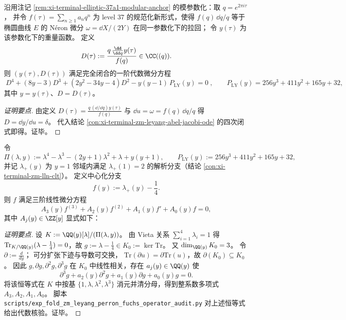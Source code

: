 \begin{conclusion}[模性--微分闭合：\texorpdfstring{$D(\tau)=\frac{q\,\partial_q y(\tau)}{f(q)}$}{D(tau)=q y'/f} 满足同一四次方程]\label{con:xi-terminal-zm-leyang-modular-differential-closure}
沿用注记 \ref{rem:xi-terminal-elliptic-37a1-modular-anchor} 的模参数化：取 \(q=e^{2\pi i\tau}\)，
并令 \(f(\tau)=\sum_{n\ge 1}a_n q^n\) 为 level \(37\) 的规范化新形式，使得 \(f(q)\,\dd q/q\) 等于椭圆曲线 \(E\) 的 N\'eron 微分 \(\omega=\dd X/(2Y)\) 在同一参数化下的拉回；
令 \(y(\tau)\) 为该参数化下的重量函数。
定义
\[
D(\tau):=\frac{q\,\frac{\dd}{\dd q}y(\tau)}{f(q)}\in \CC((q)).
\]
则 \((y(\tau),D(\tau))\) 满足完全闭合的一阶代数微分方程
\[
\boxed{\;
D^{4}+(8y-3)D^{3}+(2y^{2}-34y-4)D^{2}
-y(y-1)\,P_{\mathrm{LY}}(y)=0\;},
\qquad
P_{\mathrm{LY}}(y)=256y^{3}+411y^{2}+165y+32,
\]
其中 \(y=y(\tau)\)、\(D=D(\tau)\)。
\end{conclusion}
\begin{proof}[证明要点]
由定义 \(D(\tau)=\frac{q\,(\dd/\dd q)y(\tau)}{f(q)}\) 与 \(\dd u=\omega=f(q)\,\dd q/q\) 得 \(D=\dd y/\dd u=\delta\)。
代入结论 \ref{con:xi-terminal-zm-leyang-abel-jacobi-ode} 的四次闭式即得。证毕。
\end{proof}

\begin{conclusion}\label{con:xi-terminal-zm-leyang-perron-centered-fuchs-operator}
令
\[
\Pi(\lambda,y):=\lambda^{4}-\lambda^{3}-(2y+1)\lambda^{2}+\lambda+y(y+1),\qquad
P_{\mathrm{LY}}(y):=256y^{3}+411y^{2}+165y+32,
\]
并记 \(\lambda_{+}(y)\) 为 \(y=1\) 邻域内满足 \(\lambda_{+}(1)=2\) 的解析分支（结论 \ref{con:xi-terminal-zm-lln-clt}）。
定义中心化分支
\[
f(y):=\lambda_{+}(y)-\frac14.
\]
则 \(f\) 满足三阶线性微分方程
\[
A_{3}(y)f^{(3)}+A_{2}(y)f^{(2)}+A_{1}(y)f'+A_{0}(y)f=0,
\]
其中 \(A_{j}(y)\in\ZZ[y]\) 显式如下：

\end{conclusion}
\begin{proof}[证明要点]
设
\(
K:=\QQ(y)[\lambda]/(\Pi(\lambda,y))
\)。
由 Vieta 关系 \(\sum_{i=1}^{4}\lambda_i=1\) 得
\(
\mathrm{Tr}_{K/\QQ(y)}(\lambda-\tfrac14)=0
\)，故
\(
g:=\lambda-\tfrac14\in K_0:=\ker\mathrm{Tr}
\)。
又 \(\dim_{\QQ(y)}K_0=3\)。
令 \(\partial:=\frac{d}{dy}\)；
可分扩张下迹与导数可交换，
\(
\mathrm{Tr}(\partial u)=\partial\mathrm{Tr}(u)
\)，故 \(\partial(K_0)\subseteq K_0\)。
因此 \(g,\partial g,\partial^2 g,\partial^3 g\) 在 \(K_0\) 中线性相关，存在 \(a_j(y)\in\QQ(y)\) 使
\[
\partial^3 g+a_2(y)\partial^2 g+a_1(y)\partial g+a_0(y)g=0.
\]
将该恒等式在 \(K\) 中按基 \(\{1,\lambda,\lambda^2,\lambda^3\}\) 消元并清分母，得到整系数多项式 \(A_3,A_2,A_1,A_0\)。
脚本 \texttt{scripts/exp\_fold\_zm\_leyang\_perron\_fuchs\_operator\_audit.py} 对上述恒等式给出代数核验。证毕。
\end{proof}

